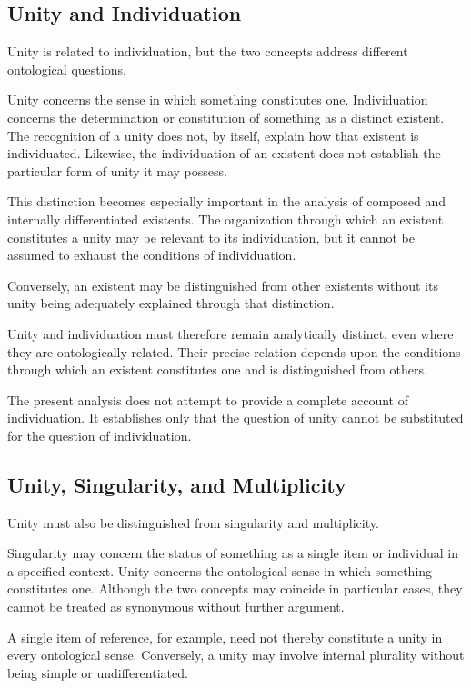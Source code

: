 \subsection{Unity and Individuation}

Unity is related to individuation,
but the two concepts address different
ontological questions.

Unity concerns the sense in which
something constitutes one. Individuation
concerns the determination or constitution
of something as a distinct existent.
The recognition of a unity does not,
by itself, explain how that existent
is individuated. Likewise, the
individuation of an existent does
not establish the particular form
of unity it may possess.

This distinction becomes especially
important in the analysis of composed
and internally differentiated existents.
The organization through which an
existent constitutes a unity may be
relevant to its individuation, but
it cannot be assumed to exhaust
the conditions of individuation.

Conversely, an existent may be
distinguished from other existents
without its unity being adequately
explained through that distinction.

Unity and individuation must therefore
remain analytically distinct, even
where they are ontologically related.
Their precise relation depends upon
the conditions through which an
existent constitutes one and is
distinguished from others.

The present analysis does not
attempt to provide a complete
account of individuation. It
establishes only that the question
of unity cannot be substituted
for the question of individuation.

\subsection{Unity, Singularity, and Multiplicity}

Unity must also be distinguished
from singularity and multiplicity.

Singularity may concern the status
of something as a single item or
individual in a specified context.
Unity concerns the ontological sense
in which something constitutes one.
Although the two concepts may
coincide in particular cases, they
cannot be treated as synonymous
without further argument.

A single item of reference, for
example, need not thereby constitute
a unity in every ontological sense.
Conversely, a unity may involve
internal plurality without being
simple or undifferentiated.

